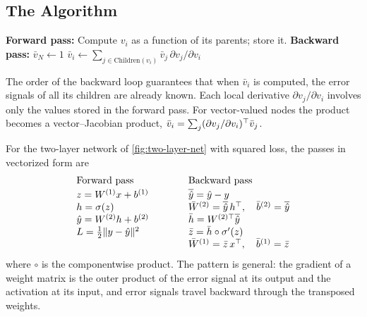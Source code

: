 \subsection{The Algorithm}

\begin{algorithm}[H]
\caption{Backpropagation (Reverse-Mode Differentiation)}\label{alg:backprop}
\begin{algorithmic}[1]
\Statex \textbf{Forward pass:}
  \State Compute $v_i$ as a function of its parents; store it.
\EndFor
\Statex \textbf{Backward pass:}
\State $\bar v_N\gets1$
  \State $\bar v_i\gets\sum_{j\in\mathrm{Children}(v_i)}\bar v_j\,\partial v_j/\partial v_i$ 
\EndFor
{}
\end{algorithmic}
\end{algorithm}

The order of the backward loop guarantees that when $\bar v_i$ is computed, the error signals of all its children are already known. Each local derivative $\partial v_j/\partial v_i$ involves only the values stored in the forward pass. For vector-valued nodes the product becomes a vector--Jacobian product, $\bar v_i=\sum_j(\partial v_j/\partial v_i)^{\top}\bar v_j$.

For the two-layer network of \cref{fig:two-layer-net} with squared loss, the passes in vectorized form are
\[
\begin{array}{@{}l@{\qquad\qquad}l@{}}
\text{Forward pass} & \text{Backward pass}\\[2pt]
z=W^{(1)}x+b^{(1)} & \overline{\hat y}=\hat y-y \\
h=\sigma(z) & \bar W^{(2)}=\overline{\hat y}\,h\T,\quad \bar b^{(2)}=\overline{\hat y} \\
\hat y=W^{(2)}h+b^{(2)} & \bar h=W^{(2)\top}\overline{\hat y} \\
L=\tfrac12\norm{y-\hat y}^2 & \bar z=\bar h\circ\sigma'(z) \\
 & \bar W^{(1)}=\bar z\,x\T,\quad \bar b^{(1)}=\bar z
\end{array}
\]
where $\circ$ is the componentwise product. The pattern is general: the gradient of a weight matrix is the outer product of the error signal at its output and the activation at its input, and error signals travel backward through the transposed weights.

